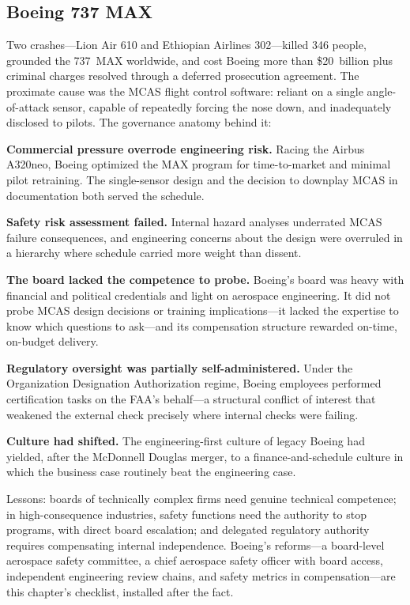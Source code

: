 \documentclass[11pt,openany]{book}
\begin{document}
\subsection{Boeing 737 MAX}

Two crashes---Lion Air 610 and Ethiopian Airlines 302---killed 346 people,
grounded the 737~MAX worldwide, and cost Boeing more than \$20~billion plus
criminal charges resolved through a deferred prosecution agreement. The
proximate cause was the MCAS flight control software: reliant on a single
angle-of-attack sensor, capable of repeatedly forcing the nose down, and
inadequately disclosed to pilots. The governance anatomy behind it:

\textbf{Commercial pressure overrode engineering risk.} Racing the Airbus
A320neo, Boeing optimized the MAX program for time-to-market and minimal
pilot retraining. The single-sensor design and the decision to downplay MCAS
in documentation both served the schedule.

\textbf{Safety risk assessment failed.} Internal hazard analyses underrated
MCAS failure consequences, and engineering concerns about the design were
overruled in a hierarchy where schedule carried more weight than dissent.

\textbf{The board lacked the competence to probe.} Boeing's board was heavy
with financial and political credentials and light on aerospace engineering.
It did not probe MCAS design decisions or training implications---it lacked
the expertise to know which questions to ask---and its compensation structure
rewarded on-time, on-budget delivery.

\textbf{Regulatory oversight was partially self-administered.} Under the
Organization Designation Authorization regime, Boeing employees performed
certification tasks on the FAA's behalf---a structural conflict of interest
that weakened the external check precisely where internal checks were
failing.

\textbf{Culture had shifted.} The engineering-first culture of legacy Boeing
had yielded, after the McDonnell Douglas merger, to a finance-and-schedule
culture in which the business case routinely beat the engineering case.

Lessons: boards of technically complex firms need genuine technical
competence; in high-consequence industries, safety functions need the
authority to stop programs, with direct board escalation; and delegated
regulatory authority requires compensating internal independence. Boeing's
reforms---a board-level aerospace safety committee, a chief aerospace safety
officer with board access, independent engineering review chains, and safety
metrics in compensation---are this chapter's checklist, installed after the
fact.
\end{document}

